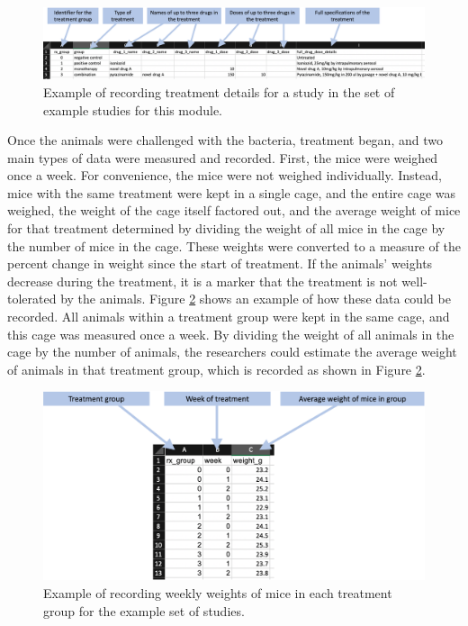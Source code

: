 \documentclass[]{tufte-book}
\begin{document}
\begin{figure}
\includegraphics[width=\textwidth]{figures/project_treatment_details} \caption[Example of recording treatment details for a study in the set of example studies for this module]{Example of recording treatment details for a study in the set of example studies for this module.}\label{fig:treatmentdetails}
\end{figure}

Once the animals were challenged with the bacteria, treatment began, and two
main types of data were measured and recorded. First, the mice were weighed once
a week. For convenience, the mice were not weighed
individually. Instead, mice with the same treatment were kept in a single cage,
and the entire cage was weighed, the weight of the cage itself factored out, and
the average weight of mice for that treatment determined by dividing the weight
of all mice in the cage by the number of mice in the cage. These weights were converted to a measure of the percent change in
weight since the start of treatment. If the animals' weights decrease during the
treatment, it is a marker that the treatment is not well-tolerated by the
animals. Figure \ref{fig:mouseweight} shows an example of how these data could be
recorded. All animals within a treatment group were kept in the same cage, and
this cage was measured once a week. By dividing the weight of all animals in the
cage by the number of animals, the researchers could estimate the average weight
of animals in that treatment group, which is recorded as shown in Figure
\ref{fig:mouseweight}.

\begin{figure}
\includegraphics[width=\textwidth]{figures/project_mouse_weights} \caption[Example of recording weekly weights of mice in each treatment group for the example set of studies]{Example of recording weekly weights of mice in each treatment group for the example set of studies.}\label{fig:mouseweight}
\end{figure}
\end{document}
